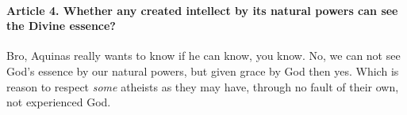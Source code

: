 \documentclass{ucetd}
\begin{document}
\paragraph{Article 4. Whether any created intellect by its natural powers can see the Divine essence?}
Bro, Aquinas really wants to know if he can know, you know. 
No, we can not see God's essence by our natural powers, but given grace by God then yes. Which is reason to respect \textit{some} atheists as they may have, through no fault of their own, not experienced God.
\end{document}
